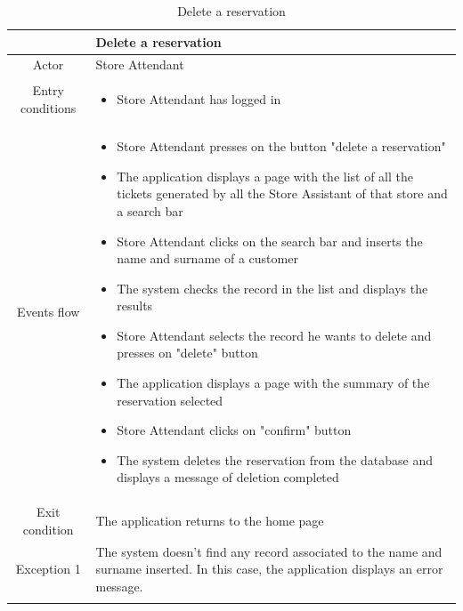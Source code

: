 \documentclass[table, 12pt]{article}
\begin{document}
\begin{longtable}{|c| p{10cm}|}
    \hline
                     & Delete a reservation                                                                                                                     \\
    \hline
    Actor            & Store Attendant                                                                                                                          \\
    \hline
    Entry conditions & \begin{itemize}
        \item Store Attendant has logged in
    \end{itemize}                                                                                                               \\
    \hline
    Events flow      & \begin{itemize}[nosep,after=\strut]
        \item Store Attendant presses on the button "delete a reservation"
        \item The application displays a page with the list of all the tickets generated by all the Store Assistant of that store and a search bar
        \item Store Attendant clicks on the search bar and inserts the name and surname of a customer
        \item The system checks the record in the list and displays the results
        \item Store Attendant selects the record he wants to delete and presses on "delete" button
        \item The application displays a page with the summary of the reservation selected
        \item Store Attendant clicks on "confirm" button
        \item The system deletes the reservation from the database and displays a message of deletion completed
    \end{itemize}                                                                                                               \\
    \hline
    Exit condition   & The application returns to the home page
    \\
    \hline
    \hline
    Exception 1      & The system doesn't find any record associated to the name and surname inserted. In this case, the application displays an error message. \\
    \hline
    \caption{Delete a reservation}                                                                                                                              \\
\end{longtable}
\end{document}
